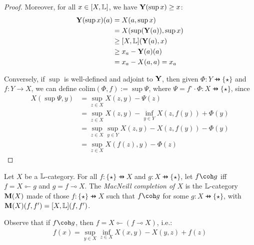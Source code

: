\begin{proof}
Moreover, for all $x\in [X,\mathbb{L}]$, we have $\mathbf{Y}(\sup x)\geq x$:  
\begin{align*}
\mathbf{Y}(\sup x)(a) &= X(a,\sup x)\\
&= X(  \sup(\mathbf{Y}(a)),\sup x) \\
& \geq [X,\mathbb{L}]( \mathbf{Y}(a), x)\\
&\geq x_{a}-\mathbf{Y}(a)(a) \\
&=
 x_{a}-X(a,a)  = x_{a}
\end{align*}
%
%
% 

Conversely, if $\sup$ is well-defined and adjoint to $\mathbf{Y}$, then 
given $\Phi: Y\pfun \{\star\}$ and $f:Y\to X$, 
we can define
$\mathrm{colim}(\Phi, f):= \sup\Psi$, where $\Psi=
 f^{\circ}\cdot \Phi: X\pfun \{\star\}$, since 
\begin{align*}
X(\sup \Psi, y)&=
\sup_{z\in X}X(z,y)-\Psi(z) \\
&=\sup_{z\in X}X(z,y)- \inf_{y\in Y}X(z,f(y))  +\Phi(y)\\
& = \sup_{z\in X}\sup_{y\in Y}X(z,y)-X(z,f(y))  -\Phi(y)\\
&=
\sup_{z\in X} X(f(z),y) - \Phi(z)
\end{align*}
\end{proof}



\begin{definition}
Let $X$ be a $\mathbb{L}$-category. For all $f: \{\star\}\pfun X$ and $g:X\pfun \{\star\}$, let $f \coh g$ iff 
$f  = X\multimapinv g $ and 
$g = f\multimap X$. 
The \emph{MacNeill completion of $X$} is the $\mathbb{L}$-category $\mathbf{M}(X)$ made of those 
$f:\{\star\}\pfun X$ such that $f\coh g$ for some $g:X\pfun \{\star\}$, with
$\mathbf{M}(X)(f,f')=[X,\mathbb{L}](f,f')$. 
\end{definition}


Observe that if $f\coh g$, then $f= X\multimapinv (f\multimap X)$, i.e.:
\begin{align}
f(x)=  \sup_{y\in X}\inf_{z\in X}X(x,y)-X(y,z) +f(z)       
\tag{COH}
\end{align}




